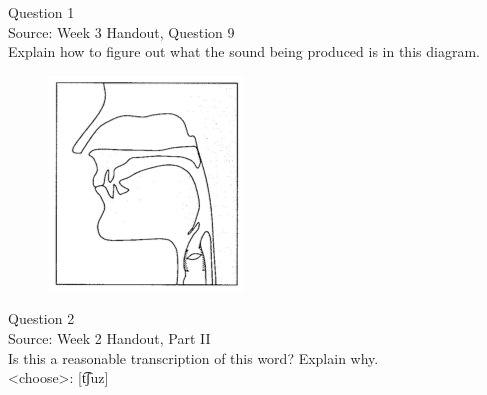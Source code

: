 \documentclass[12pt]{article}
\begin{document}
\begin{center}
\textbf{{\color{blue}{\HUGE START OF EXAM\\}}}

\textbf{{\color{blue}{\HUGE Student ID: 30263\\}}}

\textbf{{\color{blue}{\HUGE 4:40\\}}}

\end{center}
\newpage

{\large Question 1}\\

Source: Week 3 Handout, Question 9\\

Explain how to figure out what the sound being produced is in this diagram.\\

\begin{figure}[H]
\includegraphics{../images/sagittal_p.png}
\end{figure}

\newpage

{\large Question 2}\\

Source: Week 2 Handout, Part II\\

Is this a reasonable transcription of this word? Explain why.\\

<choose>: {[t͡ʃuz]}


\newpage

\begin{center}
\textbf{{\color{red}{\HUGE END OF EXAM}}}\\

\end{center}
\newpage

\begin{center}
\textbf{{\color{blue}{\HUGE START OF EXAM\\}}}

\textbf{{\color{blue}{\HUGE Student ID: 39945\\}}}

\textbf{{\color{blue}{\HUGE 4:50\\}}}

\end{center}
\newpage
\end{document}

